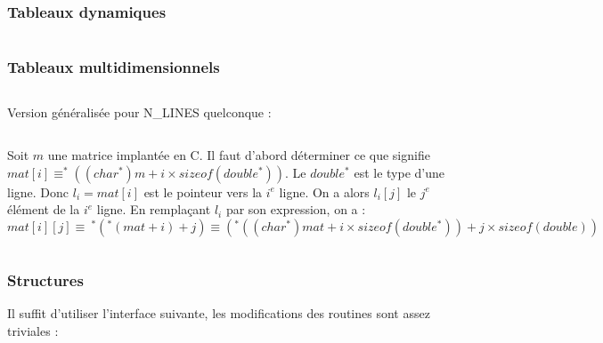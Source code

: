 \documentclass[../main.tex]{subfiles}
\begin{document}

\subsubsection{Tableaux dynamiques}
\inputminted{c}{solutions/nat2bin.c}
\subsubsection{Tableaux multidimensionnels}
\inputminted{c}{solutions/tab_display_2d.c}
\newline
Version généralisée pour \textsf{N\_LINES} quelconque : 
\inputminted{c}{solutions/triangle.c}
 \newline
Soit $m$ une matrice implantée en C. Il faut d'abord déterminer ce que signifie $mat[i] \equiv ^*((char^*)m + i\times sizeof(double^*))$. Le $double^*$ est le type d'une ligne. Donc $l_{i} = mat[i]$ est le pointeur vers la $i^{e}$ ligne. On a alors $l_{i}[j]$ le $j^e$ élément de la $i^e$ ligne. En remplaçant $l_{i}$ par son expression, on a :
$$mat[i][j] \equiv\ ^*(^*(mat + i) + j) \equiv (^*((char^*)mat + i\times sizeof(double^*)) + j\times sizeof(double)) $$
\inputminted{c}{solutions/matrix.c}
\subsubsection{Structures}
 \newline
Il suffit d'utiliser l'interface suivante, les modifications des routines sont assez triviales :
\inputminted{c}{solutions/matrix.h}
\inputminted{c}{solutions/linkedlist_1.c}
\end{document}

